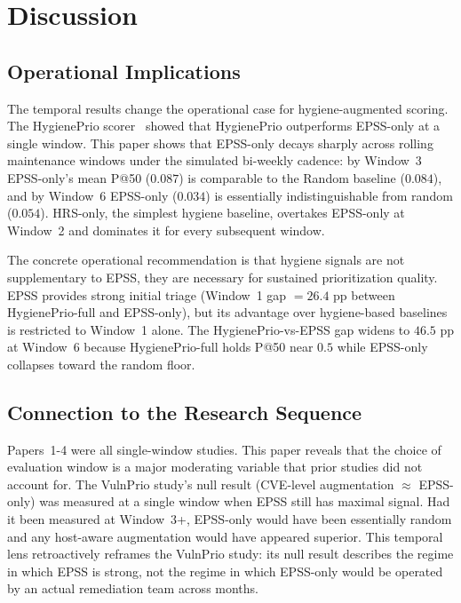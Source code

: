 \section{Discussion}

\subsection{Operational Implications}

The temporal results change the operational case for hygiene-augmented scoring. The HygienePrio scorer~\cite{paper4hygieneprio} showed that HygienePrio outperforms EPSS-only at a single window. This paper shows that EPSS-only decays sharply across rolling maintenance windows under the simulated bi-weekly cadence: by Window~3 EPSS-only's mean P@50 ($0.087$) is comparable to the Random baseline ($0.084$), and by Window~6 EPSS-only ($0.034$) is essentially indistinguishable from random ($0.054$). HRS-only, the simplest hygiene baseline, overtakes EPSS-only at Window~2 and dominates it for every subsequent window.

The concrete operational recommendation is that hygiene signals are not supplementary to EPSS, they are necessary for sustained prioritization quality. EPSS provides strong initial triage (Window~1 gap $= 26.4$ pp between HygienePrio-full and EPSS-only), but its advantage over hygiene-based baselines is restricted to Window~1 alone. The HygienePrio-vs-EPSS gap widens to $46.5$ pp at Window~6 because HygienePrio-full holds P@50 near $0.5$ while EPSS-only collapses toward the random floor.

\subsection{Connection to the Research Sequence}

Papers~1-4 were all single-window studies. This paper reveals that the choice of evaluation window is a major moderating variable that prior studies did not account for. The VulnPrio study's null result (CVE-level augmentation $\approx$ EPSS-only) was measured at a single window when EPSS still has maximal signal. Had it been measured at Window~3+, EPSS-only would have been essentially random and any host-aware augmentation would have appeared superior. This temporal lens retroactively reframes the VulnPrio study: its null result describes the regime in which EPSS is strong, not the regime in which EPSS-only would be operated by an actual remediation team across months.

